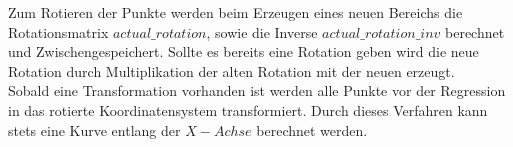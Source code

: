 Zum Rotieren der Punkte werden beim Erzeugen eines neuen Bereichs die Rotationsmatrix $actual\_rotation$, sowie die Inverse $actual\_rotation\_inv$ berechnet und Zwischengespeichert. Sollte es bereits eine Rotation geben wird die neue Rotation durch Multiplikation der alten Rotation mit der neuen erzeugt.\\
Sobald eine Transformation vorhanden ist werden alle Punkte vor der Regression in das rotierte Koordinatensystem transformiert. Durch dieses Verfahren kann stets eine Kurve entlang der $X-Achse$ berechnet werden.
